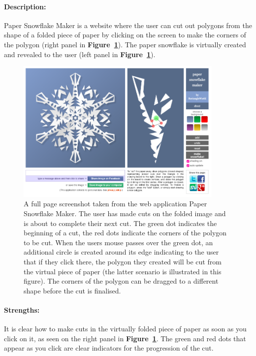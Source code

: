 \documentclass[11pt]{article}
\begin{document}
                \paragraph{Description:}
                Paper Snowflake Maker is a website where the user can cut out polygons from the shape of a folded piece of paper by clicking on the screen to make the corners of the polygon (right panel in \textbf{Figure~\ref{fig:paperSnowflakeMaker}}). The paper snowflake is virtually created and revealed to the user (left panel in \textbf{Figure~\ref{fig:paperSnowflakeMaker}}).
                    \begin{figure}[ht]\centering\includegraphics[width=0.9\textwidth]{Images/paperSnowflakeMaker}
                        \caption{
                        \label{fig:paperSnowflakeMaker}
                        A full page screenshot taken from the web application Paper Snowflake Maker. The user has made cuts on the folded image and is about to complete their next cut. The green dot indicates the beginning of a cut, the red dots indicate the corners of the polygon to be cut. When the users mouse passes over the green dot, an additional circle is created around its edge indicating to the user that if they click there, the polygon they created will be cut from the virtual piece of paper (the latter scenario is illustrated in this figure). The corners of the polygon can be dragged to a different shape before the cut is finalised.}
                    \end{figure}
                    
                \paragraph{Strengths:}
                It is clear how to make cuts in the virtually folded piece of paper as soon as you click on it, as seen on the right panel in \textbf{Figure~\ref{fig:paperSnowflakeMaker}}. The green and red dots that appear as you click are clear indicators for the progression of the cut.
                
\end{document}
